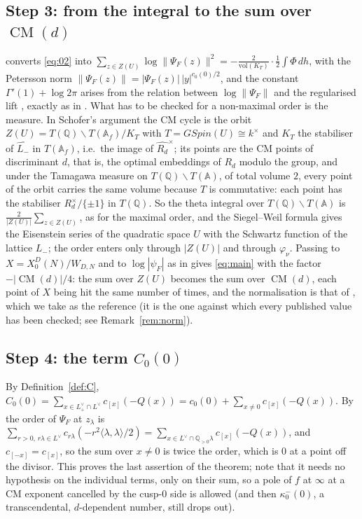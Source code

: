\documentclass[11pt,reqno]{amsart}
\theoremstyle{plain}
\theoremstyle{definition}
\DeclareMathOperator{\CM}{CM}
\newcommand{\Q}{\mathbb{Q}}
\newcommand{\A}{\mathbb{A}}
\newcommand{\Ldual}{L^{\vee}}
\newcommand{\Lm}{L_{-}}
\newcommand{\Lp}{L_{+}}
\begin{document}
\subsection*{Step 3: from the integral to the sum over $\CM(d)$}
\cite[Cor.~3.5(i)]{Schofer} converts \eqref{eq:02} into $\sum_{z\in Z(U)}\log\lVert\Psi_F(z)\rVert^2
=-\frac{2}{\mathrm{vol}(K_T)}\cdot\frac12\int\Phi\,dh$, with the Petersson norm
$\lVert\Psi_F(z)\rVert=|\Psi_F(z)|\,|y|^{c_0(0)/2}$, and the constant $\Gamma'(1)+\log2\pi$ arises
from the relation between $\log\lVert\Psi_F\rVert$ and the regularised lift \cite[Thm.~13.3]{Borcherds},
exactly as in \cite[Thm.~B, Remark~15(1)]{Yang}. What has to be checked for a non-maximal order
is the measure. In Schofer's argument the CM cycle is the orbit $Z(U)=T(\Q)\backslash T(\A_f)/K_T$
with $T=GSpin(U)\cong k^\times$ and $K_T$ the stabiliser of $\widehat{\Lm}$ in $T(\A_f)$, i.e.\
the image of $\widehat{R_d}^\times$; its points are the CM points of discriminant $d$, that is, the
optimal embeddings of $R_d$ modulo the group, and under the Tamagawa measure on
$T(\Q)\backslash T(\A)$, of total volume $2$, every point of the orbit carries the same volume
because $T$ is commutative: each point has the stabiliser $R_d^\times/\{\pm1\}$ in $T(\Q)$. So
the theta integral over $T(\Q)\backslash T(\A)$ is $\frac{2}{|Z(U)|}\sum_{z\in Z(U)}$, as for the
maximal order, and the Siegel--Weil formula gives the Eisenstein series of the quadratic space $U$
with the Schwartz function of the lattice $\Lm$; the order enters only through $|Z(U)|$ and through
$\varphi_\nu$. Passing to $X=X_0^D(N)/W_{D,N}$ and to $\log|\psi_F|$ as in \cite[Remark~15(1)]{Yang}
gives \eqref{eq:main} with the factor $-|\CM(d)|/4$: the sum over $Z(U)$ becomes the sum over
$\CM(d)$, each point of $X$ being hit the same number of times, and the normalisation is that of
\cite[Thm.~B]{Yang}, which we take as the reference (it is the one against which every published
value has been checked; see Remark~\ref{rem:norm}).

\subsection*{Step 4: the term $C_0(0)$}
By Definition~\ref{def:C}, $C_0(0)=\sum_{x\in\Lp^\vee\cap\Ldual}c_{[x]}(-Q(x))=c_0(0)+
\sum_{x\neq0}c_{[x]}(-Q(x))$. By \cite[Thm.~A(2)]{Yang} the order of $\Psi_F$ at $z_\lambda$ is
$\sum_{r>0,\,r\lambda\in\Ldual}c_{r\lambda}(-r^2\langle\lambda,\lambda\rangle/2)=\sum_{x\in\Ldual
\cap\Q_{>0}\lambda}c_{[x]}(-Q(x))$, and $c_{[-x]}=c_{[x]}$, so the sum over $x\ne0$ is twice the
order, which is $0$ at a point off the divisor. This proves the last assertion of the theorem; note
that it needs no hypothesis on the individual terms, only on their sum, so a pole of $f$ at
$\infty$ at a CM exponent cancelled by the cusp-$0$ side is allowed (and then
$\kappa^-_0(0)$, a transcendental, $d$-dependent number, still drops out).
\end{document}
